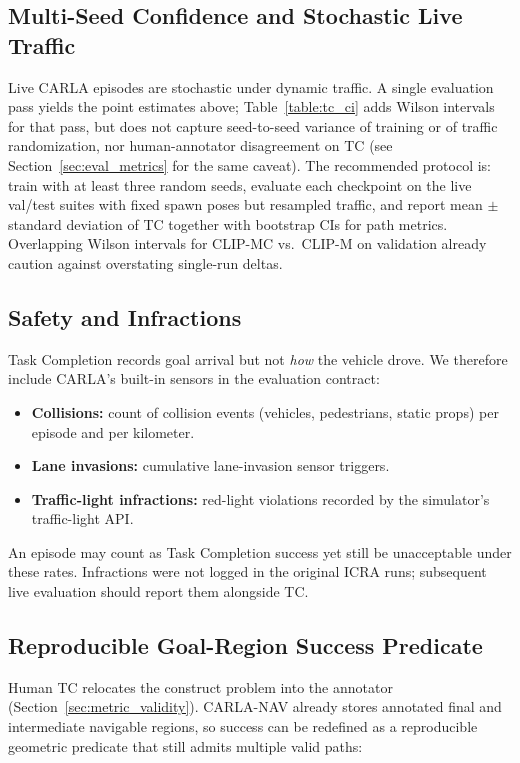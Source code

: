 \subsection{Multi-Seed Confidence and Stochastic Live Traffic}

Live CARLA episodes are stochastic under dynamic traffic. A single evaluation pass yields the point estimates above; Table~\ref{table:tc_ci} adds Wilson intervals for that pass, but does not capture seed-to-seed variance of training or of traffic randomization, nor human-annotator disagreement on TC (see Section~\ref{sec:eval_metrics} for the same caveat). The recommended protocol is: train with at least three random seeds, evaluate each checkpoint on the live val/test suites with fixed spawn poses but resampled traffic, and report mean $\pm$ standard deviation of TC together with bootstrap CIs for path metrics. Overlapping Wilson intervals for CLIP-MC vs.\ CLIP-M on validation already caution against overstating single-run deltas.

\subsection{Safety and Infractions}

Task Completion records goal arrival but not \emph{how} the vehicle drove. We therefore include CARLA's built-in sensors in the evaluation contract:

\begin{itemize}
    \item \textbf{Collisions:} count of collision events (vehicles, pedestrians, static props) per episode and per kilometer.
    \item \textbf{Lane invasions:} cumulative lane-invasion sensor triggers.
    \item \textbf{Traffic-light infractions:} red-light violations recorded by the simulator's traffic-light API.
\end{itemize}

An episode may count as Task Completion success yet still be unacceptable under these rates. Infractions were not logged in the original ICRA runs; subsequent live evaluation should report them alongside TC.

\subsection{Reproducible Goal-Region Success Predicate}
\label{sec:reproducible_tc}

Human TC relocates the construct problem into the annotator (Section~\ref{sec:metric_validity}). CARLA-NAV already stores annotated final and intermediate navigable regions, so success can be redefined as a reproducible geometric predicate that still admits multiple valid paths:

